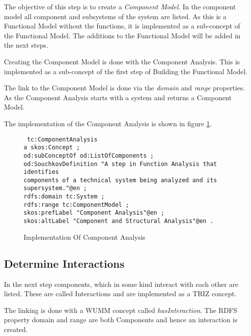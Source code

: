 The objective of this step is to create a \textit{Component Model}. 
In the component model all component and subsystems of the system are listed.
As this is a Functional Model without the functions, it is implemented as a sub-concept of the Functional Model.
The additions to the Functional Model will be added in the next steps.

Creating the Component Model is done with the Component Analysis. 
This is implemented as a sub-concept of the first step of Building the Functional Model.

The link to the Component Model is done via the \textit{domain} and \textit{range} properties.
As the Component Analysis starts with a system and returns a Component Model.

The implementation of the Component Analysis is shown in figure \ref{fig:implementation_component_analysis}.

\begin{figure}[H]
    \centering
    \begin{code}\tt
        tc:ComponentAnalysis\\
        \> a skos:Concept ;\\
        \> od:subConceptOf od:ListOfComponents ;\\
        \> od:SouchkovDefinition "A step in Function Analysis that identifies\\
        \> \> components of a technical system being analyzed and its supersystem."@en ;\\
        \> rdfs:domain tc:System ;\\
        \> rdfs:range tc:ComponentModel ;\\
        \> skos:prefLabel "Component Analysis"@en ;\\
        \> skos:altLabel "Component and Structural Analysis"@en .
    \end{code}
    \caption{Implementation Of Component Analysis}
    \label{fig:implementation_component_analysis}
\end{figure}

\subsection{Determine Interactions}

In the next step components, which in some kind interact with each other are listed. 
These are called Interactions and are implemented as a TRIZ concept. 

The linking is done with a WUMM concept called \textit{hasInteraction}. 
The RDFS property domain and range are both Components and hence an interaction is created.

